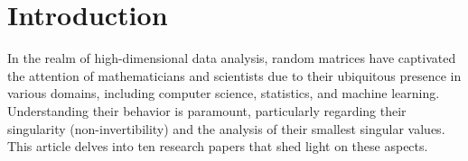 \section{Introduction}


In the realm of high-dimensional data analysis, random matrices have captivated the attention of mathematicians and scientists due to their ubiquitous presence in various domains, including computer science, statistics, and machine learning. Understanding their behavior is paramount, particularly regarding their singularity (non-invertibility) and the analysis of their smallest singular values. This article delves into ten research papers that shed light on these aspects.
